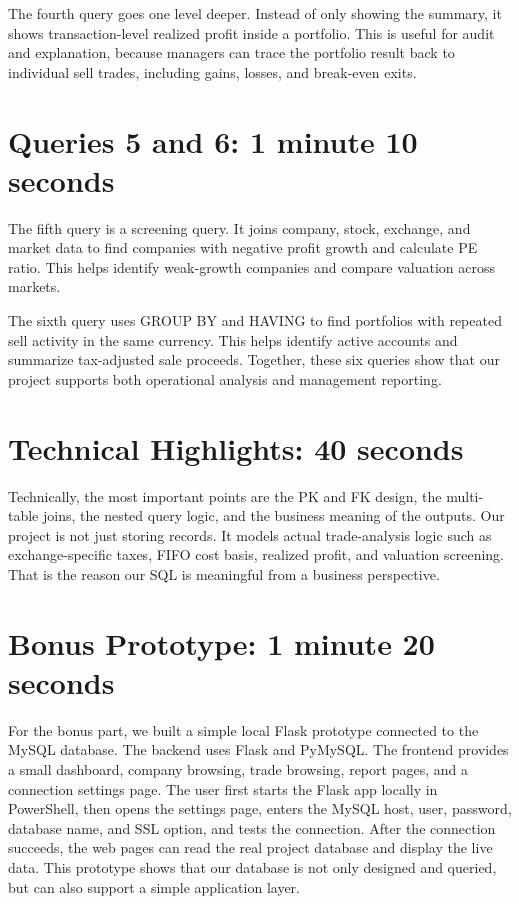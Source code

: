 \documentclass[11pt]{article}
\begin{document}
The fourth query goes one level deeper. Instead of only showing the summary, it shows transaction-level realized profit inside a portfolio. This is useful for audit and explanation, because managers can trace the portfolio result back to individual sell trades, including gains, losses, and break-even exits.

\section*{Queries 5 and 6: 1 minute 10 seconds}
The fifth query is a screening query. It joins company, stock, exchange, and market data to find companies with negative profit growth and calculate PE ratio. This helps identify weak-growth companies and compare valuation across markets.

The sixth query uses GROUP BY and HAVING to find portfolios with repeated sell activity in the same currency. This helps identify active accounts and summarize tax-adjusted sale proceeds. Together, these six queries show that our project supports both operational analysis and management reporting.

\section*{Technical Highlights: 40 seconds}
Technically, the most important points are the PK and FK design, the multi-table joins, the nested query logic, and the business meaning of the outputs. Our project is not just storing records. It models actual trade-analysis logic such as exchange-specific taxes, FIFO cost basis, realized profit, and valuation screening. That is the reason our SQL is meaningful from a business perspective.

\section*{Bonus Prototype: 1 minute 20 seconds}
For the bonus part, we built a simple local Flask prototype connected to the MySQL database. The backend uses Flask and PyMySQL. The frontend provides a small dashboard, company browsing, trade browsing, report pages, and a connection settings page. The user first starts the Flask app locally in PowerShell, then opens the settings page, enters the MySQL host, user, password, database name, and SSL option, and tests the connection. After the connection succeeds, the web pages can read the real project database and display the live data. This prototype shows that our database is not only designed and queried, but can also support a simple application layer.
\end{document}
